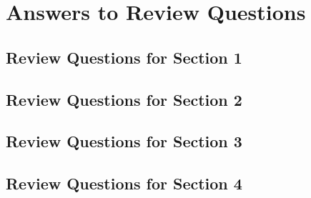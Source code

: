 \documentclass[11pt]{report}
\begin{document}

\chapter*{Answers to Review Questions}

\section*{Review Questions for Section 1}


\section*{Review Questions for Section 2}


\section*{Review Questions for Section 3}


\section*{Review Questions for Section 4}

\end{document}
